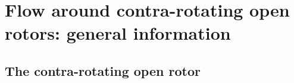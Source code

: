 \chapter{Flow around contra-rotating open rotors: general information}
\label{cha:cror_ael}

\chabstract{}

\minitoc
\newpage

% 

\section{The contra-rotating open rotor}
\label{sec:ca_cror}


\chconclu{}
